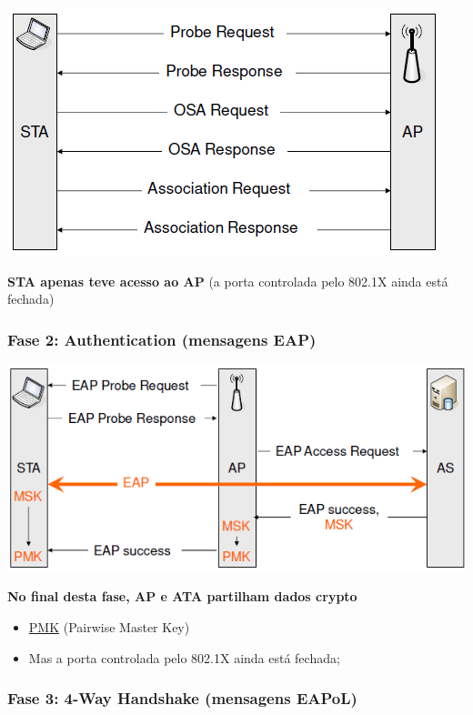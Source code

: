 \documentclass{article}
\begin{document}
\begin{center}
  \includegraphics[scale=0.6]{51}
\end{center}

\textbf{STA apenas teve acesso ao AP} (a porta controlada pelo 802.1X ainda está fechada)

\subsubsection*{Fase 2: Authentication (mensagens EAP)}

\begin{center}
  \includegraphics[scale=0.6]{52}
\end{center}

\textbf{No final desta fase, AP e ATA partilham dados crypto}
\begin{itemize}
  \item \uline{PMK} (Pairwise Master Key)
  \item Mas a porta controlada pelo 802.1X ainda está fechada;
\end{itemize}

\subsubsection*{Fase 3: 4-Way Handshake (mensagens EAPoL)}
\end{document}
